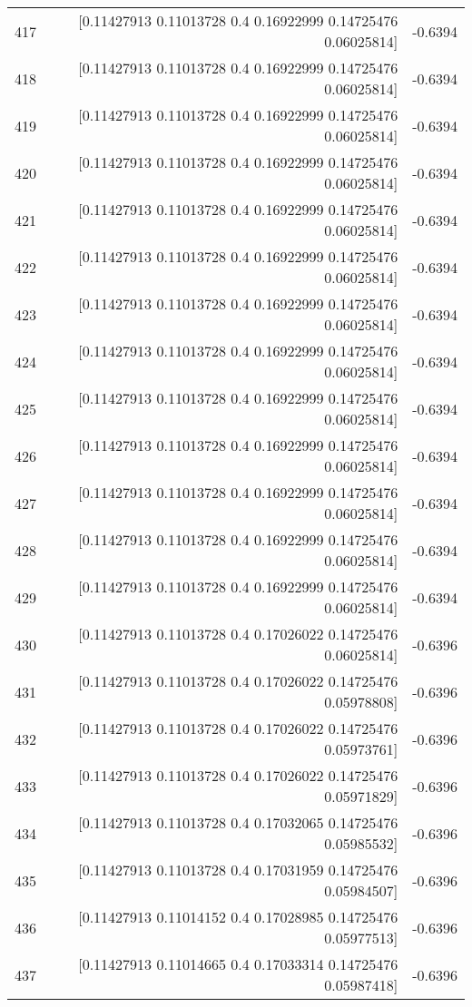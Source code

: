 \begin{longtable}{lrr}
417 & [0.11427913 0.11013728 0.4        0.16922999 0.14725476 0.06025814] & -0.6394 \\
418 & [0.11427913 0.11013728 0.4        0.16922999 0.14725476 0.06025814] & -0.6394 \\
419 & [0.11427913 0.11013728 0.4        0.16922999 0.14725476 0.06025814] & -0.6394 \\
420 & [0.11427913 0.11013728 0.4        0.16922999 0.14725476 0.06025814] & -0.6394 \\
421 & [0.11427913 0.11013728 0.4        0.16922999 0.14725476 0.06025814] & -0.6394 \\
422 & [0.11427913 0.11013728 0.4        0.16922999 0.14725476 0.06025814] & -0.6394 \\
423 & [0.11427913 0.11013728 0.4        0.16922999 0.14725476 0.06025814] & -0.6394 \\
424 & [0.11427913 0.11013728 0.4        0.16922999 0.14725476 0.06025814] & -0.6394 \\
425 & [0.11427913 0.11013728 0.4        0.16922999 0.14725476 0.06025814] & -0.6394 \\
426 & [0.11427913 0.11013728 0.4        0.16922999 0.14725476 0.06025814] & -0.6394 \\
427 & [0.11427913 0.11013728 0.4        0.16922999 0.14725476 0.06025814] & -0.6394 \\
428 & [0.11427913 0.11013728 0.4        0.16922999 0.14725476 0.06025814] & -0.6394 \\
429 & [0.11427913 0.11013728 0.4        0.16922999 0.14725476 0.06025814] & -0.6394 \\
430 & [0.11427913 0.11013728 0.4        0.17026022 0.14725476 0.06025814] & -0.6396 \\
431 & [0.11427913 0.11013728 0.4        0.17026022 0.14725476 0.05978808] & -0.6396 \\
432 & [0.11427913 0.11013728 0.4        0.17026022 0.14725476 0.05973761] & -0.6396 \\
433 & [0.11427913 0.11013728 0.4        0.17026022 0.14725476 0.05971829] & -0.6396 \\
434 & [0.11427913 0.11013728 0.4        0.17032065 0.14725476 0.05985532] & -0.6396 \\
435 & [0.11427913 0.11013728 0.4        0.17031959 0.14725476 0.05984507] & -0.6396 \\
436 & [0.11427913 0.11014152 0.4        0.17028985 0.14725476 0.05977513] & -0.6396 \\
437 & [0.11427913 0.11014665 0.4        0.17033314 0.14725476 0.05987418] & -0.6396 \\

\end{longtable}
